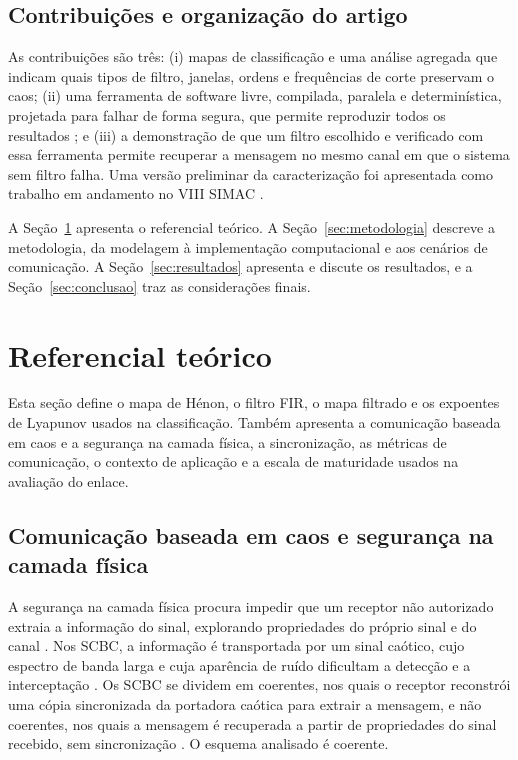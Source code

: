 \documentclass{pfccefsa}
\begin{document}
\subsection{Contribuições e organização do artigo}

As contribuições são três: (i) mapas de classificação e uma análise agregada
que indicam quais tipos de filtro, janelas, ordens e frequências de corte
preservam o caos; (ii) uma ferramenta de software livre, compilada, paralela e
determinística, projetada para falhar de forma segura, que permite reproduzir
todos os resultados \cite{chaoticPFC2026}; e (iii) a demonstração de que um
filtro escolhido e verificado com essa ferramenta permite recuperar a mensagem
no mesmo canal em que o sistema sem filtro falha. Uma versão preliminar da
caracterização foi apresentada como trabalho em andamento no VIII SIMAC
\cite{Pereira2026SIMAC}.

A Seção~\ref{sec:fundamentacao} apresenta o referencial teórico. A
Seção~\ref{sec:metodologia} descreve a metodologia, da modelagem à
implementação computacional e aos cenários de comunicação. A
Seção~\ref{sec:resultados} apresenta e discute os resultados, e a
Seção~\ref{sec:conclusao} traz as considerações finais.

\section{Referencial teórico}
\label{sec:fundamentacao}

Esta seção define o mapa de Hénon, o filtro FIR, o mapa filtrado e os expoentes
de Lyapunov usados na classificação. Também apresenta a comunicação baseada em
caos e a segurança na camada física, a sincronização, as métricas de comunicação,
o contexto de aplicação e a escala de maturidade usados na avaliação do enlace.

\subsection{Comunicação baseada em caos e segurança na camada física}
\label{sub:seguranca_caos}

A segurança na camada física procura impedir que um receptor não autorizado
extraia a informação do sinal, explorando propriedades do próprio sinal e do
canal \cite{Mukherjee2014,Chorti2022}. Nos SCBC, a informação é transportada por um
sinal caótico, cujo espectro de banda larga e cuja aparência de ruído dificultam
a detecção e a interceptação \cite{Baptista2021}. Os SCBC se dividem em
coerentes, nos quais o receptor reconstrói uma cópia sincronizada da portadora
caótica para extrair a mensagem, e não coerentes, nos quais a mensagem é
recuperada a partir de propriedades do sinal recebido, sem sincronização
\cite{Kaddoum2016}. O esquema analisado é coerente.
\end{document}
